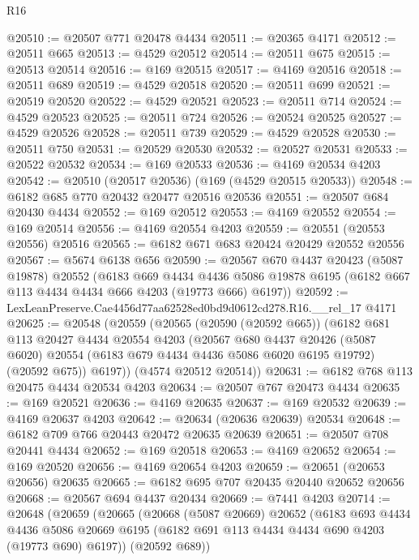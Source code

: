 \begin{lexlean}{R16}
\begin{coremodule}
@20510 := @20507 @771 @20478 @4434
@20511 := @20365 @4171
@20512 := @20511 @665
@20513 := @4529 @20512
@20514 := @20511 @675
@20515 := @20513 @20514
@20516 := @169 @20515
@20517 := @4169 @20516
@20518 := @20511 @689
@20519 := @4529 @20518
@20520 := @20511 @699
@20521 := @20519 @20520
@20522 := @4529 @20521
@20523 := @20511 @714
@20524 := @4529 @20523
@20525 := @20511 @724
@20526 := @20524 @20525
@20527 := @4529 @20526
@20528 := @20511 @739
@20529 := @4529 @20528
@20530 := @20511 @750
@20531 := @20529 @20530
@20532 := @20527 @20531
@20533 := @20522 @20532
@20534 := @169 @20533
@20536 := @4169 @20534 @4203
@20542 := @20510 (@20517 @20536) (@169 (@4529 @20515 @20533))
@20548 := @6182 @685 @770 @20432 @20477 @20516 @20536
@20551 := @20507 @684 @20430 @4434
@20552 := @169 @20512
@20553 := @4169 @20552
@20554 := @169 @20514
@20556 := @4169 @20554 @4203
@20559 := @20551 (@20553 @20556) @20516
@20565 := @6182 @671 @683 @20424 @20429 @20552 @20556
@20567 := @5674 @6138 @656
@20590 := @20567
    @670
    @4437
    @20423
    (@5087 @19878)
    @20552
    (@6183
      @669
      @4434
      @4436
      @5086
      @19878
      @6195
      (@6182 @667 @113 @4434 @4434 @666 @4203 (@19773 @666) @6197))
@20592 := LexLeanPreserve.Cae4456d77aa62528ed0bd9d0612cd278.R16.__rel_17 @4171
@20625 := @20548
    (@20559
      (@20565
        (@20590 (@20592 @665))
        (@6182
          @681
          @113
          @20427
          @4434
          @20554
          @4203
          (@20567
            @680
            @4437
            @20426
            (@5087 @6020)
            @20554
            (@6183 @679 @4434 @4436 @5086 @6020 @6195 @19792)
            (@20592 @675))
          @6197))
      (@4574 @20512 @20514))
@20631 := @6182 @768 @113 @20475 @4434 @20534 @4203
@20634 := @20507 @767 @20473 @4434
@20635 := @169 @20521
@20636 := @4169 @20635
@20637 := @169 @20532
@20639 := @4169 @20637 @4203
@20642 := @20634 (@20636 @20639) @20534
@20648 := @6182 @709 @766 @20443 @20472 @20635 @20639
@20651 := @20507 @708 @20441 @4434
@20652 := @169 @20518
@20653 := @4169 @20652
@20654 := @169 @20520
@20656 := @4169 @20654 @4203
@20659 := @20651 (@20653 @20656) @20635
@20665 := @6182 @695 @707 @20435 @20440 @20652 @20656
@20668 := @20567 @694 @4437 @20434
@20669 := @7441 @4203
@20714 := @20648
    (@20659
      (@20665
        (@20668
          (@5087 @20669)
          @20652
          (@6183
            @693
            @4434
            @4436
            @5086
            @20669
            @6195
            (@6182 @691 @113 @4434 @4434 @690 @4203 (@19773 @690) @6197))
          (@20592 @689))

\end{coremodule}
\end{lexlean}
